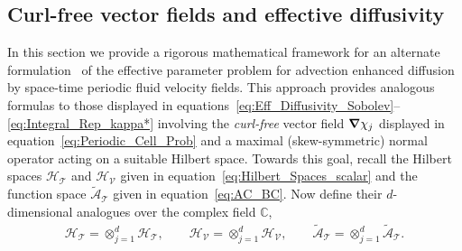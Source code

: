 \documentclass[leqno,onefignum,onetabnum]{siamltex1213}
\newcommand{\Tc}{\mathcal{T}}
\newcommand{\Vc}{\mathcal{V}}
\newcommand{\Hc}{\mathcal{H}}
\newcommand{\Ac}{\mathcal{A}}
\newcommand{\Hs}{\mathscr{H}}
\newcommand{\As}{\mathscr{A}}
\newcommand\bnabla{\mbox{\boldmath${\nabla}$}}
\begin{document}
\subsection{Curl-free vector fields and effective diffusivity}
\label{sec:Curl_Free_Fields}
%
In this section we provide a rigorous mathematical framework for an
alternate formulation~\cite{Avellaneda:PRE:3249} of the effective
parameter problem for advection enhanced diffusion by space-time
periodic fluid velocity fields.  This approach provides analogous
formulas to those displayed in
equations~\eqref{eq:Eff_Diffusivity_Sobolev}--\eqref{eq:Integral_Rep_kappa*}
involving the \emph{curl-free} vector field $\bnabla\chi_j$ displayed in
equation~\eqref{eq:Periodic_Cell_Prob} and a maximal (skew-symmetric)
normal operator acting on a suitable Hilbert space. Towards this goal,
recall the Hilbert spaces $\Hs_{\Tc}$ and $\Hs_{\Vc}$ given in
equation~\eqref{eq:Hilbert_Spaces_scalar} and the function space
$\tilde{\As}_{\Tc}$ given in equation~\eqref{eq:AC_BC}.
Now define
their $d$-dimensional analogues over the complex field $\mathbb{C}$,  
%
\begin{align}\label{eq:Hilbert_Spaces_vector}
  \Hc_{\Tc}=\otimes_{j=1}^d\Hs_{\Tc}, \qquad
  \Hc_{\Vc}=\otimes_{j=1}^d\Hs_{\Vc}, \qquad
  \tilde{\Ac}_{\Tc}=\otimes_{j=1}^d\tilde{\As}_{\Tc}.
\end{align}
%
\end{document}
